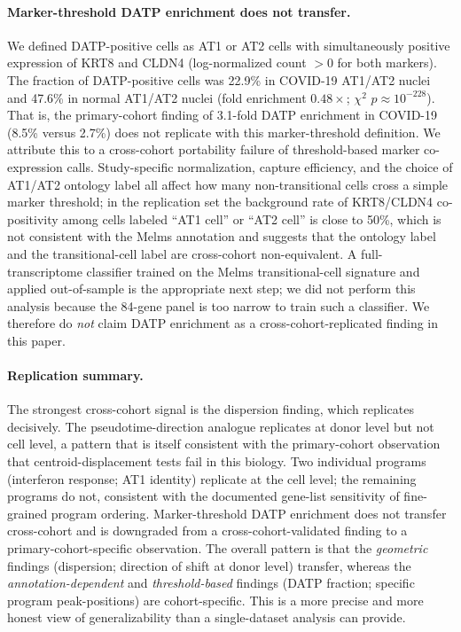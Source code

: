 \documentclass[11pt]{article}
\begin{document}
\paragraph{Marker-threshold DATP enrichment does not transfer.} We defined DATP-positive cells as AT1 or AT2 cells with simultaneously positive expression of KRT8 and CLDN4 (log-normalized count $> 0$ for both markers). The fraction of DATP-positive cells was 22.9\% in COVID-19 AT1/AT2 nuclei and 47.6\% in normal AT1/AT2 nuclei (fold enrichment $0.48\times$; $\chi^2$ $p \approx 10^{-228}$). That is, the primary-cohort finding of 3.1-fold DATP enrichment in COVID-19 (8.5\% versus 2.7\%) does not replicate with this marker-threshold definition. We attribute this to a cross-cohort portability failure of threshold-based marker co-expression calls. Study-specific normalization, capture efficiency, and the choice of AT1/AT2 ontology label all affect how many non-transitional cells cross a simple marker threshold; in the replication set the background rate of KRT8/CLDN4 co-positivity among cells labeled ``AT1 cell'' or ``AT2 cell'' is close to 50\%, which is not consistent with the Melms annotation and suggests that the ontology label and the transitional-cell label are cross-cohort non-equivalent. A full-transcriptome classifier trained on the Melms transitional-cell signature and applied out-of-sample is the appropriate next step; we did not perform this analysis because the 84-gene panel is too narrow to train such a classifier. We therefore do \emph{not} claim DATP enrichment as a cross-cohort-replicated finding in this paper.

\paragraph{Replication summary.} The strongest cross-cohort signal is the dispersion finding, which replicates decisively. The pseudotime-direction analogue replicates at donor level but not cell level, a pattern that is itself consistent with the primary-cohort observation that centroid-displacement tests fail in this biology. Two individual programs (interferon response; AT1 identity) replicate at the cell level; the remaining programs do not, consistent with the documented gene-list sensitivity of fine-grained program ordering. Marker-threshold DATP enrichment does not transfer cross-cohort and is downgraded from a cross-cohort-validated finding to a primary-cohort-specific observation. The overall pattern is that the \emph{geometric} findings (dispersion; direction of shift at donor level) transfer, whereas the \emph{annotation-dependent} and \emph{threshold-based} findings (DATP fraction; specific program peak-positions) are cohort-specific. This is a more precise and more honest view of generalizability than a single-dataset analysis can provide.
\end{document}
